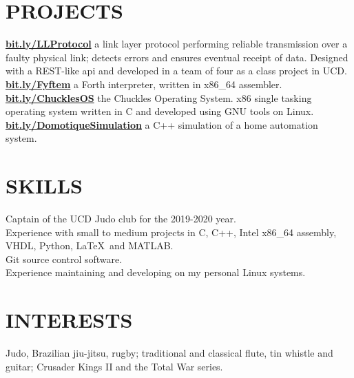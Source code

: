 \documentclass[margin,centered,10pt]{res}
\let\oldhref\href
\renewcommand{\href}[2]{\oldhref{#1}{\textbf{#2}}}
\begin{document}
\begin{resume}
\section{PROJECTS }
\href{http://bit.ly/LLProtocol}{bit.ly/LLProtocol} a link layer protocol performing reliable transmission over a faulty physical link; detects errors and ensures eventual receipt of data. Designed with a REST-like api and developed in a team of four as a class project in UCD.\\
\href{http://bit.ly/Fyftem}{bit.ly/Fyftem} a Forth interpreter, written in x86\_64 assembler.\\
\href{http://bit.ly/ChucklesOS}{bit.ly/ChucklesOS} the Chuckles Operating System. x86 single tasking operating system written in C and developed using GNU tools on Linux.\\
\href{http://bit.ly/DomotiqueSimulation}{bit.ly/DomotiqueSimulation} a C++ simulation of a home automation system.\\

\section{SKILLS}
Captain of the UCD Judo club for the 2019-2020 year.\\
Experience with small to medium projects in C, C++, Intel x86\_64 assembly, VHDL, Python, \LaTeX\ and MATLAB.\\
Git source control software.\\
Experience maintaining and developing on my personal Linux systems.
\section{INTERESTS}
Judo, Brazilian jiu-jitsu, rugby; traditional and classical flute, tin whistle and guitar; Crusader Kings II and the Total War series.

\end{resume}
\end{document}
